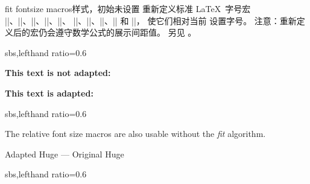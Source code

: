 \clearpage
\begin{docTcbKey}{fit fontsize macros}{}{样式，初始未设置}
  重新定义标准 \LaTeX\ 字号宏
  |\tiny|、|\scriptsize|、|\footnotesize|、|\small|、|\normalsize|、
  |\large|、|\Large|、|\LARGE|、|\huge| 和 |\Huge|，
  使它们相对当前  设置字号。
  注意：重新定义后的宏仍会遵守数学公式的展示间距值。
  另见 。

\begin{dispExample*}{sbs,lefthand ratio=0.6}

\begin{tcolorbox}[fit to height=4cm]
  {\Large\bfseries This text is
             not adapted:\par}
  \lipsum[2]
\end{tcolorbox}

\begin{tcolorbox}[fit to height=4cm,
  fit fontsize macros ]
  {\Large\bfseries This text is adapted:\par}
  \lipsum[2]
\end{tcolorbox}
\end{dispExample*}

\begin{dispExample*}{sbs,lefthand ratio=0.6}

\let\realHuge=\Huge

\begin{tcolorbox}[fit basedim=7pt,
  fontupper=\normalsize,
  fit fontsize macros]
The relative font size macros
are also usable without the
\textit{fit} algorithm.\par
{\Huge Adapted Huge} ---
{\realHuge Original Huge}
\end{tcolorbox}

\end{dispExample*}


\begin{dispExample*}{sbs,lefthand ratio=0.6}

\tcboxfit[height=5cm,
  fit fontsize macros,
  fonttitle=\normalsize\bfseries,
  title=Adapted title]
{\lipsum[2]}

\end{dispExample*}
\end{docTcbKey}


